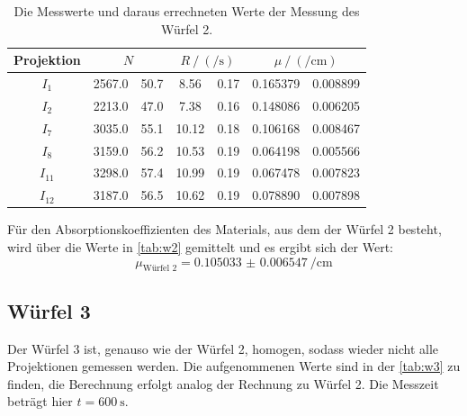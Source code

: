   \begin{table}[H]
    \centering
    \caption{Die Messwerte und daraus errechneten Werte der Messung des Würfel 2.}
    \label{tab:w2}
    \begin{tabular}{c S[table-format=4.1] @{${}\pm{}$} S[table-format=2.1] S[table-format=3.2] @{${}\pm{}$} S[table-format=1.2] S[table-format=1.6] @{${}\pm{}$} S[table-format=1.6]}
      \toprule
      {Projektion} &  &  &  \\
      \midrule
      $I_1$ & 2567.0 & 50.7 &  8.56 & 0.17 & 0.165379 & 0.008899 \\
      $I_2$ & 2213.0 & 47.0 &  7.38 & 0.16 & 0.148086 & 0.006205 \\
      $I_7$ & 3035.0 & 55.1 & 10.12 & 0.18 & 0.106168 & 0.008467 \\
      $I_8$ & 3159.0 & 56.2 & 10.53 & 0.19 & 0.064198 & 0.005566 \\
      $I_{11}$& 3298.0 & 57.4 & 10.99 & 0.19 & 0.067478 & 0.007823 \\
      $I_{12}$& 3187.0 & 56.5 & 10.62 & 0.19 & 0.078890 & 0.007898 \\
      \bottomrule  
    \end{tabular}
  \end{table}

  \noindent Für den Absorptionskoeffizienten des Materials, aus dem der Würfel 2 besteht, wird über die Werte in \autoref{tab:w2} gemittelt und es 
  ergibt sich der Wert:
  \begin{equation*}
    \mu_{\text{Würfel 2}} = \SI{0.105033(6547)}{\per\centi\metre} 
  \end{equation*}

\subsection{Würfel 3}

  \noindent Der Würfel 3 ist, genauso wie der Würfel 2, homogen, sodass wieder nicht alle Projektionen gemessen werden. Die aufgenommenen Werte sind 
  in der \autoref{tab:w3} zu finden, die Berechnung erfolgt analog der Rechnung zu Würfel 2. Die Messzeit beträgt hier $t= \SI{600}{\second}$. 

